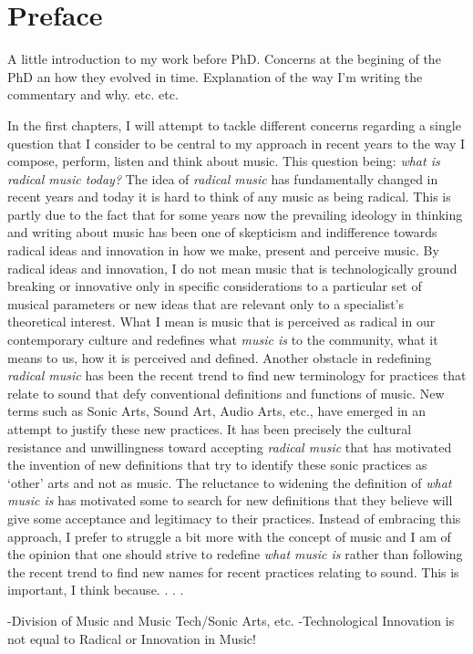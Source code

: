 \chapter{Preface}



A little introduction to my work before PhD. Concerns at the begining of the PhD an how they evolved in time. Explanation of the way I'm writing the commentary and why. etc. etc.

In the first chapters, I will attempt to tackle different concerns regarding a single question that I consider to be central to my approach in recent years to the way I compose, perform, listen and think about music. This question being: \emph{what is radical music today?} The idea of \emph{radical music} has fundamentally changed in recent years and today it is hard to think of any music as being radical. This is partly due to the fact that for some years now the prevailing ideology in thinking and writing about music has been one of skepticism and indifference towards radical ideas and innovation in how we make, present and perceive music. By radical ideas and innovation, I do not mean music that is technologically ground breaking or innovative only in specific considerations to a particular set of musical parameters or new ideas that are relevant only to a specialist's theoretical interest. What I mean is music that is perceived as radical in our contemporary culture and redefines what \emph{music is} to the community, what it means to us, how it is perceived and defined.
Another obstacle in redefining \emph{radical music} has been the recent trend to find new terminology for practices that relate to sound that defy conventional definitions and functions of music. New terms such as Sonic Arts, Sound Art, Audio Arts, etc., have emerged in an attempt to justify these new practices. It has been precisely the cultural resistance and unwillingness toward accepting \emph{radical music} that has motivated the invention of new definitions that try to identify these sonic practices as `other' arts and not as music. The reluctance to widening the definition of \emph{what music is} has motivated some to search for new definitions that they believe will give some acceptance and legitimacy to their practices. Instead of embracing this approach, I prefer to struggle a bit more with the concept of music and I am of the opinion that one should strive to redefine \emph{what music is} rather than following the recent trend to find new names for recent practices relating to sound. This is important, I think because. . . .

-Division of Music and Music Tech/Sonic Arts, etc.
-Technological Innovation is not equal to Radical or Innovation in Music!

\label{ch:intro}
